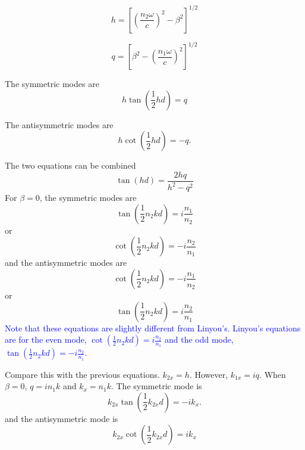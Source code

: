 \documentclass[12pt]{article}
\numberwithin{equation}{section}
\newcommand{\blue}[1]{\textcolor{blue}{#1}} %
\begin{document}
\begin{equation}
h = \left [ \left ( \frac{n_2 \omega}{c} \right )^2 - \beta^2 \right ] ^{1/2}
\end{equation}

\begin{equation}
q = \left [ \beta^2 -  \left ( \frac{n_1 \omega}{c} \right )^2 \right ] ^{1/2}
\end{equation}

The symmetric modes are
\begin{equation}
h \tan (\frac{1}{2} h d ) = q
\end{equation}

The antisymmetric modes are
\begin{equation}
h \cot ( \frac{1}{2} h d ) = - q.
\end{equation}

The two equations can be combined
\begin{equation}
\tan (h d) = \frac{2 h q}{h^2 - q^2}
\end{equation}
For $\beta = 0$, the symmetric modes are 
\begin{equation}
 \tan (\frac{1}{2} n_2 k d) = i \frac{n_1}{n_2}
\end{equation}
or 
\begin{equation}
 \cot (\frac{1}{2} n_2 k d) = -i \frac{n_2}{n_1}
\end{equation}
and the antisymmetric modes are 
\begin{equation}
 \cot (\frac{1}{2} n_2 k d) = - i \frac{n_1}{n_2}
\end{equation}
or 
\begin{equation}
 \tan (\frac{1}{2} n_2 k d) = i \frac{n_2}{n_1}
\end{equation}
\blue{Note that these equations are slightly different from Linyou's.
Linyou's equations are for the even mode, 
$\cot (\frac{1}{2} n_2 k d ) = i \frac{n_2}{n_1} $
and the odd mode, 
$
\tan (\frac{1}{2} n_2 k d ) = - i \frac{n_2}{n_1} $.}

Compare this with the previous equations.  $k_{2x} = h$.  
However, $k_{1x} = i q$.  
When $\beta = 0$, $q = i n_1 k$ and $k_{x} = n_1 k$.  
The symmetric mode is 
\begin{equation}
k_{2x} \tan (\frac{1}{2} k_{2x} d ) = - i k_x.
\end{equation}
and the antisymmetric mode is
\begin{equation}
k_{2x} \cot (\frac{1}{2} k_{2x} d ) = i k_x
\end{equation}
\end{document}

